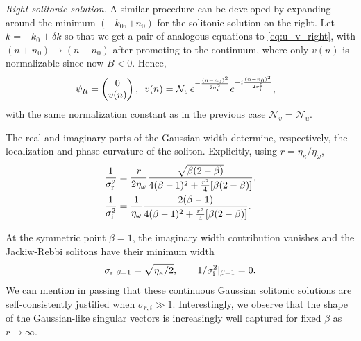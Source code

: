 \documentclass[a4paper,twocolumn,floatfix,10pt,superscriptaddress]%
{quantumarticle}
\newcommand{\mcl}[1]{\mathcal{#1}}
\begin{document}
\emph{Right solitonic solution.}
A similar procedure can be developed by expanding around the minimum $(-k_0,+n_0)$ for the solitonic solution on the right. 
Let $k=-k_0+\delta k$
so that we get a pair of analogous equations to \eqref{eq:u_v_right}, with $(n+n_0)\rightarrow (n-n_0)$ 
after promoting to the continuum, where only $v(n)$ is normalizable since now $B < 0$.
Hence,
\begin{align}
\begin{aligned}
\psi_{R}&=
\begin{pmatrix}0\\v(n)\end{pmatrix},
\,\,\,
v(n)=\mcl{N}_v\,e^{-\frac{(n-n_0)^2}{2\sigma_{\rm r}^2}}
      e^{-i\frac{(n-n_0)^2}{2\sigma_{\rm i}^2}},
\end{aligned}
\end{align}
with the same normalization constant as in the previous case $\mcl{N}_v=\mcl{N}_u$.

The real and imaginary parts of the Gaussian width determine, respectively, the localization and phase curvature of the soliton. Explicitly, using $r=\eta_\kappa/\eta_\omega$,
\begin{align}
\frac{1}{\sigma_{\rm r}^2}
&=\frac{r}{2\eta_\omega}
  \frac{\sqrt{\beta(2-\beta)}}
       {4(\beta-1)^2+\frac{r^2}{4}[\beta(2-\beta)]},\\
\frac{1}{\sigma_{\rm i}^2}
&=\frac{1}{\eta_\omega}
  \frac{2(\beta-1)}
       {4(\beta-1)^2+\frac{r^2}{4}[\beta(2-\beta)]}.
\label{widths}       
\end{align}

At the symmetric point $\beta=1$, the imaginary width contribution vanishes and the Jackiw-Rebbi solitons have their minimum width
%
\begin{equation}
\sigma_{\rm r}|_{\beta=1}=\sqrt{\eta_\kappa/2},\qquad
1/\sigma_{\rm i}^2|_{\beta=1}=0.
\end{equation}
%
We can mention in passing that these continuous Gaussian solitonic solutions are self-consistently justified when $\sigma_{r,i}\gg 1$. Interestingly, we observe that the shape of the Gaussian-like singular vectors is increasingly well captured for fixed $\beta$ as  $r\rightarrow \infty$.
\end{document}
